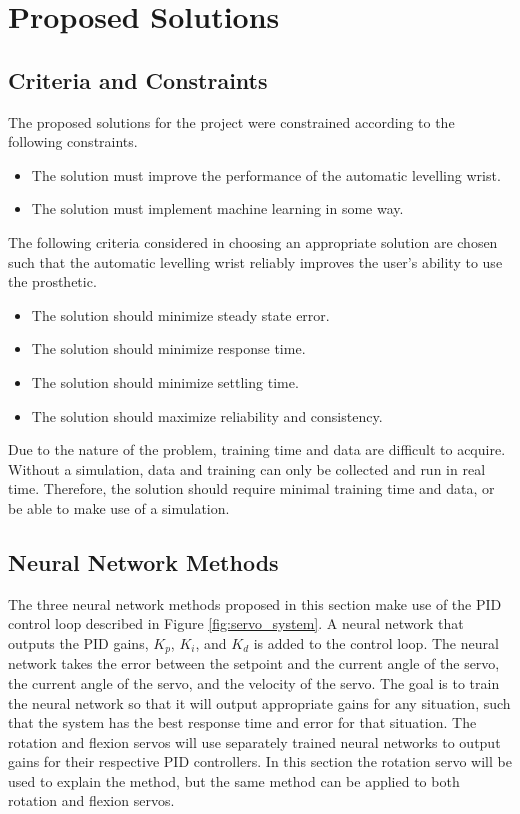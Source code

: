 \documentclass[letterpaper,12pt]{article}
\begin{document}
\section{Proposed Solutions}
\subsection{Criteria and Constraints}

The proposed solutions for the project were constrained according to the following constraints.
\begin{itemize}
		\item The solution must improve the performance of the automatic levelling wrist.
    \item The solution must implement machine learning in some way.

\end{itemize}

The following criteria considered in choosing an appropriate solution are chosen such that the automatic levelling wrist reliably improves the user's ability to use the prosthetic.
\begin{itemize}
    \item The solution should minimize steady state error.
		\item The solution should minimize response time.
		\item The solution should minimize settling time.
		\item The solution should maximize reliability and consistency.
\end{itemize}
Due to the nature of the problem, training time and data are difficult to acquire. Without a simulation, data and training can only be collected and run in real time. Therefore, the solution should require minimal training time and data, or be able to make use of a simulation.


\subsection{Neural Network Methods}
The three neural network methods proposed in this section make use of the PID control loop described in Figure \ref{fig:servo_system}. A neural network that outputs the PID gains, $K_p$, $K_i$, and $K_d$ is added to the control loop. The neural network takes the error between the setpoint and the current angle of the servo, the current angle  of the servo, and the velocity of the servo. The goal is to train the neural network so that it will output appropriate gains for any situation, such that the system has the best response time and error for that situation. The rotation and flexion servos will use separately trained neural networks to output gains for their respective PID controllers. In this section the rotation servo will be used to explain the method, but the same method can be applied to both rotation and flexion servos.
\end{document}
